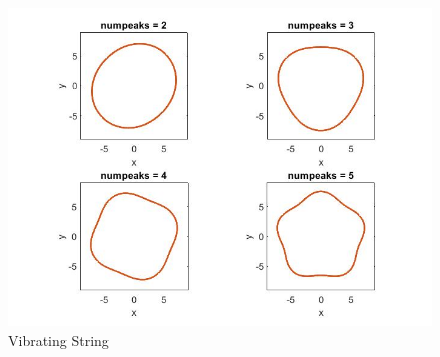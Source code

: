 \documentclass[../paper.tex]{subfiles}
\begin{document}
\begin{figure}[h]
\centering
\includegraphics[scale = 0.5]{Computational Problems/vibratingstring.jpg}
\caption{Vibrating String}
\label{Vibrating String}
\end{figure}
\end{document}
